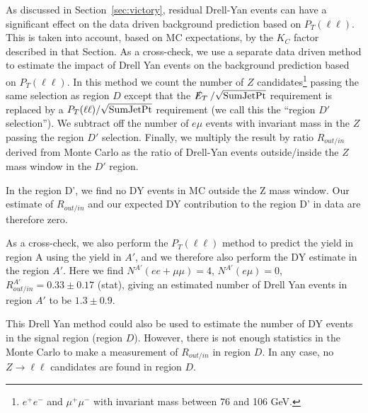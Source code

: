 
As discussed in Section~\ref{sec:victory}, residual Drell-Yan 
events can have a significant effect on the data driven background
prediction based on $P_T(\ell\ell)$.  This is taken into account,
based on MC expectations, 
by the $K_C$ factor described in that Section.  
As a cross-check, we use a separate data driven method to 
estimate the impact of Drell Yan events on the 
background prediction based on $P_T(\ell\ell)$. 
In this method\cite{ref:top} we count the number 
of $Z$ candidates\footnote{$e^+e^-$ and $\mu^+\mu^-$
with invariant mass between 76 and 106 GeV.}
passing the same selection as 
region $D$ except that the $\met/\sqrt{\rm SumJetPt}$ requirement is 
replaced by a $P_T(\ell\ell)/\sqrt{\rm SumJetPt}$ requirement
(we call this the ``region $D'$ selection'').
We subtract off the number of $e\mu$ events with 
invariant mass in the $Z$ passing the region $D'$ selection.
Finally, we multiply the result by ratio $R_{out/in}$ derived
from Monte Carlo as the ratio of Drell-Yan events
outside/inside the $Z$ mass window 
in the $D'$ region.

In the region D', we find no DY events in MC outside the Z mass window.
Our estimate of $R_{out/in}$ and our expected DY contribution to the region
D' in data are therefore zero.


As a cross-check, we also perform the $P_{T}(\ell\ell)$ method to
predict the yield in region A using the yield in $A'$, and
we therefore also perform the DY estimate in the region $A'$. Here we find
$N^{A'}(ee+\mu\mu)=4$, $N^{A'}(e\mu)=0$,
$R^{A'}_{out/in}=0.33\pm0.17$ (stat), giving an estimated 
number of Drell Yan events in region $A'$ to 
be $1.3 \pm 0.9$. 


This Drell Yan method could also be used to estimate 
the number of DY events in the signal region (region $D$).
However, there is not enough statistics in the Monte 
Carlo to make a measurement of $R_{out/in}$ in region 
$D$.  In any case, no $Z \to \ell\ell$ candidates are
found in region $D$.  



